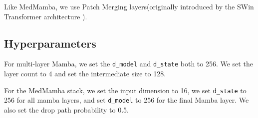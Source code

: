 Like MedMamba, we use Patch Merging layers(originally introduced by the SWin
Transformer architecture \cite{swintrans}).

\subsection{Hyperparameters}
For multi-layer Mamba, we set the \verb|d_model| and \verb|d_state| both to 256.
We set the layer count to 4 and set the intermediate size to 128.

For the MedMamba stack, we set the input dimension to 16, we set \verb|d_state|
to 256 for all mamba layers, and set \verb|d_model| to 256 for the final Mamba
layer.
We also set the drop path probability to 0.5.
